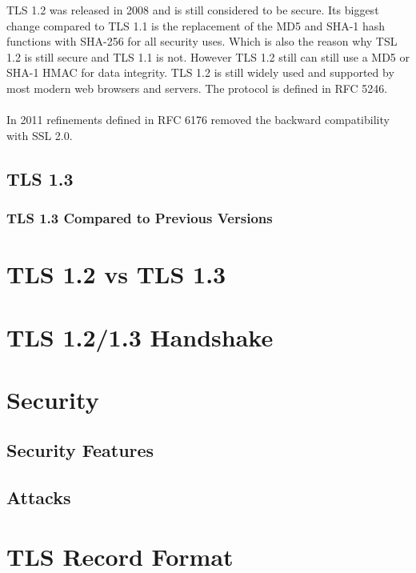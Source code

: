 \documentclass[11pt]{scrartcl} %
\begin{document}
TLS 1.2 was released in 2008 and is still considered to be secure. Its biggest change compared to TLS 1.1 is the replacement of the MD5 and SHA-1 hash functions with SHA-256 for all security uses. Which is also the reason why TSL 1.2 is still secure and TLS 1.1 is not. However TLS 1.2 still can still use a MD5 or SHA-1 HMAC for data integrity. TLS 1.2 is still widely used and supported by most modern web browsers and servers. The protocol is defined in RFC 5246.
\\\\
In 2011 refinements defined in RFC 6176 removed the backward compatibility with SSL 2.0.

\subsection{TLS 1.3}

\subsubsection{TLS 1.3 Compared to Previous Versions}



\section{TLS 1.2 vs TLS 1.3}

\section{TLS 1.2/1.3 Handshake}

\section{Security}

\subsection{Security Features}

\subsection{Attacks}

\section{TLS Record Format}
\end{document}
